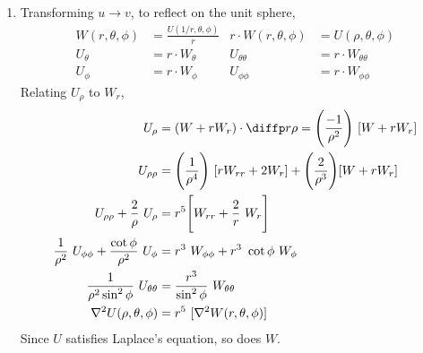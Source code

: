 \begin{enumerate}
    \item Transforming $ u \to v $, to reflect on the unit sphere,
          \begin{align}
              W(r, \theta, \phi)         & = \frac{U(1/r, \theta, \phi)}{r} &
              r \cdot W(r, \theta, \phi) & =  U(\rho, \theta, \phi)           \\
              U_\theta                   & = r \cdot W_\theta               &
              U_{\theta\theta}           & = r \cdot W_{\theta\theta}         \\
              U_\phi                     & = r \cdot W_\phi                 &
              U_{\phi\phi}               & = r \cdot W_{\phi\phi}
          \end{align}
          Relating $ U_\rho $ to $ W_r $,
          \begin{align}
              U_\rho                                & = (W + rW_r) \cdot \diffp r\rho
              = \Bigg( \frac{-1}{\rho^2} \Bigg) \ [W + rW_r]                           \\
              U_{\rho\rho}                          & = \Bigg( \frac{1}{\rho^4} \Bigg)
              \ [rW_{rr} + 2W_r] + \Bigg( \frac{2}{\rho^3} \Bigg) [W + rW_r]           \\
              U_{\rho\rho} + \frac{2}{\rho}\ U_\rho & = r^5 \Bigg[ W_{rr}
              + \frac{2}{r}\ W_r \Bigg]                                                \\
              \frac{1}{\rho^2}\ U_{\phi\phi}
              + \frac{\cot\phi}{\rho^2}\ U_\phi     & = r^3\ W_{\phi\phi}
              + r^3\ \cot\phi\ W_\phi                                                  \\
              \frac{1}{\rho^2 \sin^2\phi}
              \ U_{\theta\theta}                    & = \frac{r^3}{\sin^2\phi}
              \ W_{\theta\theta}                                                       \\
              \nabla^2 U(\rho, \theta, \phi)        & = r^5\ [\nabla^2 W(r, \theta
              , \phi)]
          \end{align}
          Since $ U $ satisfies Laplace's equation, so does $ W $.
\end{enumerate}